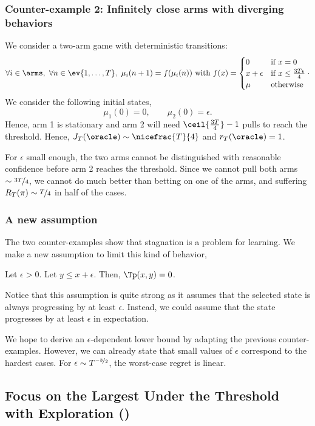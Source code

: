 \subsubsection{Counter-example 2: Infinitely close arms with diverging behaviors}
We consider a two-arm game with deterministic transitions:
\[
\forall i \in \arms,\  \forall n \in \ev{1, \dots, T},\ \mu_i(n+1) = f(\mu_i(n)) \text{ with } f(x) = \begin{cases}
0 &\text{if } x = 0\\
x +\epsilon &\text{if } x \leq \frac{3T\epsilon}{4} \\
\mu &\text{otherwise}
\end{cases}\cdot
\]
We consider the following initial states,
\[
\mu_1(0) = 0, \qquad \mu_2(0) = \epsilon.
\]
Hence, arm 1 is stationary and arm 2 will need $\ceil{\frac{3T}{4}}-1$ pulls to reach the threshold. Hence, $J_T(\oracle) \sim \nicefrac{T}{4}$ and $r_T(\oracle) =1$. 

For $\epsilon$ small enough, the two arms cannot be distinguished with reasonable confidence before arm 2 reaches the threshold. Since we cannot pull both arms $\sim \nicefrac{3T}{4}$, we cannot do much better than betting on one of the arms, and suffering $R_T(\pi) \sim \nicefrac{T}{4}$ in half of the cases.


\subsubsection{A new assumption}
The two counter-examples show that stagnation is a problem for learning. We make a new assumption to limit this kind of behavior,

\begin{assumption}
\label{assum:min-increase}
Let $\epsilon>0$. Let $y \leq x +\epsilon$. Then, $\Tp(x,y) =0$.
\end{assumption}

Notice that this assumption is quite strong as it assumes that the selected state is always progressing by at least $\epsilon$. Instead, we could assume that the state progresses by at least $\epsilon$ in expectation. 

We hope to derive an $\epsilon$-dependent lower bound by adapting the previous counter-examples. However, we can already state that small values of $\epsilon$ correspond to the hardest cases. For $\epsilon \sim T^{\nicefrac{-3}{2}}$, the worst-case regret is linear. 

\subsection{Focus on the Largest Under the Threshold with Exploration ({\FLUTE})}
